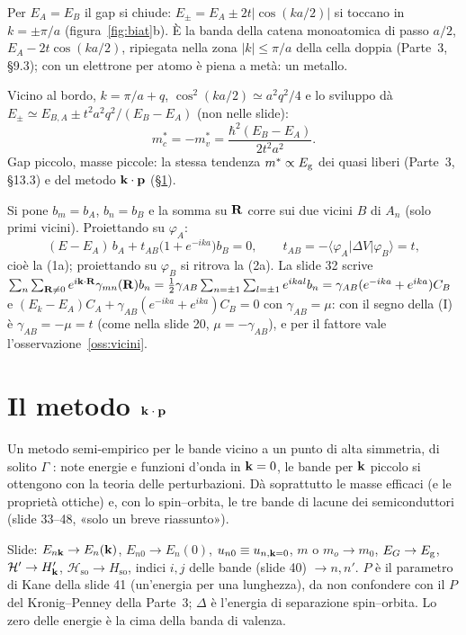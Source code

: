 \documentclass[11pt,a4paper]{article}
\begin{document}
Per $E_A=E_B$ il gap si chiude: $E_\pm=E_A\pm2t|\cos(ka/2)|$ si toccano in $k=\pm\pi/a$ (figura~\ref{fig:biat}b). È la banda della catena monoatomica
di passo $a/2$, $E_A-2t\cos(ka/2)$, ripiegata nella zona $|k|\le\pi/a$ della cella doppia (Parte~3, §9.3); con un elettrone per atomo è piena a metà:
un metallo.

\begin{risultato}
Vicino al bordo, $k=\pi/a+q$, $\cos^2(ka/2)\simeq a^2q^2/4$ e lo sviluppo dà $E_\pm\simeq E_{B,A}\pm t^2a^2q^2/(E_B-E_A)$ (non nelle slide):
\[
m^*_c=-m^*_v=\frac{\hbar^2(E_B-E_A)}{2t^2a^2}.
\]
Gap piccolo, masse piccole: la stessa tendenza $m^*\propto E_{\mathrm g}$ dei quasi liberi (Parte~3, §13.3) e del metodo $\mathbf k\cdot\mathbf p$ (§\ref{sec:kp}).
\end{risultato}

Si pone $b_m=b_A$, $b_n=b_B$ e la somma su $\mathbf R$ corre sui due vicini $B$ di $A_n$ (solo primi vicini). Proiettando su $\varphi_A$:
\[
(E-E_A)\,b_A+t_{AB}\bigl(1+e^{-ika}\bigr)b_B=0,\qquad t_{AB}=-\langle\varphi_A|\Delta V|\varphi_B\rangle=t ,
\]
cioè la (1a); proiettando su $\varphi_B$ si ritrova la (2a). La slide 32 scrive $\sum_n\sum_{\mathbf R\ne0}e^{i\mathbf k\cdot\mathbf R}\gamma_{mn}(\mathbf R)b_n=\frac12\gamma_{AB}
\sum_{n=\pm1}\sum_{l=\pm1}e^{ikal}b_n=\gamma_{AB}(e^{-ika}+e^{ika})C_B$ e $(E_k-E_A)C_A+\gamma_{AB}(e^{-ika}+e^{ika})C_B=0$ con $\gamma_{AB}=\mu$: con il
segno della (I) è $\gamma_{AB}=-\mu=t$ (come nella slide 20, $\mu=-\gamma_{AB}$), e per il fattore vale l'osservazione~\ref{oss:vicini}.

\section{Il metodo $\mathbf k\cdot\mathbf p$}\label{sec:kp}
Un metodo semi-empirico per le bande vicino a un punto di alta simmetria, di solito $\Gamma$ : note energie e funzioni d'onda in
$\mathbf k=0$, le bande per $\mathbf k$ piccolo si ottengono con la teoria delle perturbazioni. Dà soprattutto le masse efficaci (e le proprietà ottiche) e, con lo
spin--orbita, le tre bande di lacune dei semiconduttori (slide 33--48, «solo un breve riassunto»).

\begin{osservazione}[notazione]
Slide: $E_{n\mathbf k}\to E_n(\mathbf k)$, $E_{n0}\to E_n(0)$, $u_{n0}\equiv u_{n,\mathbf k=0}$, $m$ o $m_o\to m_0$, $E_G\to E_{\mathrm g}$, $\mathcal H'\to H'_{\mathbf k}$,
$\mathcal H_{\mathrm{so}}\to H_{\mathrm{so}}$, indici $i,j$ delle bande (slide 40) $\to n,n'$. $P$ è il parametro di Kane della slide 41 (un'energia per
una lunghezza), da non confondere con il $P$ del Kronig--Penney della Parte~3; $\Delta$ è l'energia di separazione spin--orbita. Lo zero delle energie
è la cima della banda di valenza.
\end{osservazione}
\end{document}
